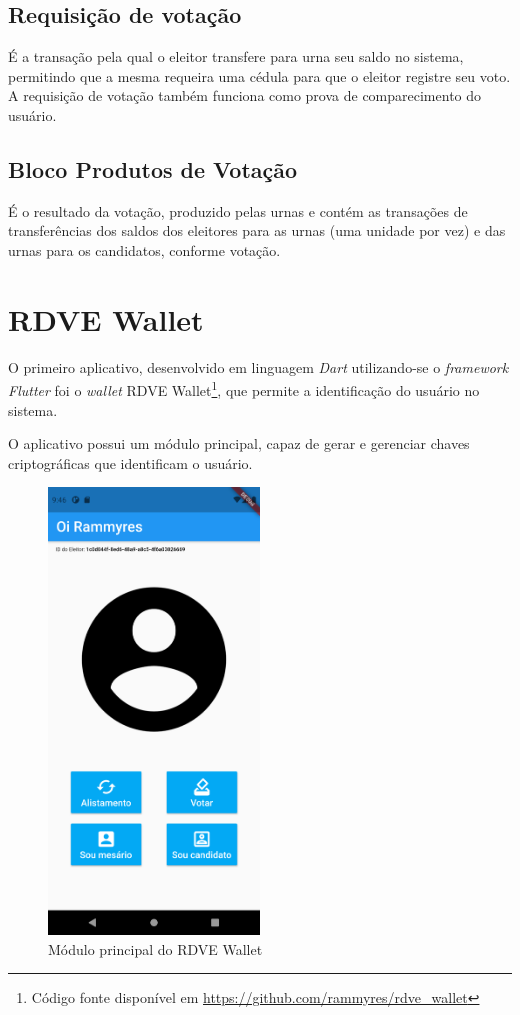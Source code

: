\subsection{Requisição de votação}
É a transação pela qual o eleitor transfere para urna seu saldo no sistema, permitindo que a mesma requeira uma cédula para que o eleitor registre seu voto. A requisição de votação também funciona como prova de comparecimento do usuário. 

\subsection{Bloco Produtos de Votação}

É o resultado da votação, produzido pelas urnas e contém as transações de transferências dos saldos dos eleitores para as urnas (uma unidade por vez) e das urnas para os candidatos, conforme votação.

\section{RDVE Wallet}

O primeiro aplicativo, desenvolvido em linguagem \textit{Dart} utilizando-se o \textit{framework Flutter} foi o \textit{\gls{wallet}} RDVE Wallet\footnote{Código fonte disponível em \url{https://github.com/rammyres/rdve_wallet}}, que permite a identificação do usuário no sistema. 

O aplicativo possui um módulo principal, capaz de gerar e gerenciar chaves criptográficas que identificam o usuário. 

\begin{figure}[!h]
	\centering
	\includegraphics[width=0.5\textwidth]{imagens/wallet1}
	\caption{Módulo principal do RDVE Wallet}
	\label{fig:wallet1}
\end{figure}
\clearpage


